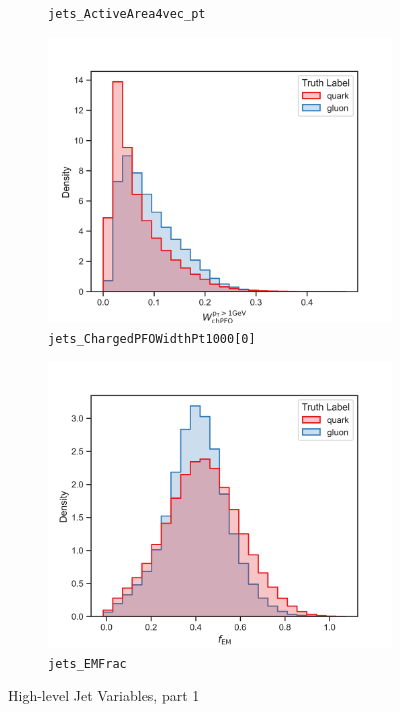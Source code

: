 \begin{figure}[!htb]
\begin{subfigure}[t]{0.49\textwidth}
		\caption{\texttt{jets\_ActiveArea4vec\_pt}}
		\label{fig:highlevel_3}
	\end{subfigure}
	\begin{subfigure}[t]{0.49\textwidth}
		\includegraphics[width=1\textwidth]{src/plots/distributions/highlevel/jets_ChargedPFOWidthPt1000[0].png}
		\caption{\texttt{jets\_ChargedPFOWidthPt1000[0]}}
		\label{fig:highlevel_4}
	\end{subfigure}
	\begin{subfigure}[t]{0.49\textwidth}
		\includegraphics[width=1\textwidth]{src/plots/distributions/highlevel/jets_EMFrac.png}
		\caption{\texttt{jets\_EMFrac}}
		\label{fig:highlevel_5}
	\end{subfigure}
\caption{High-level Jet Variables, part 1}
\label{fig:highlevel_0-5}
\end{figure}

